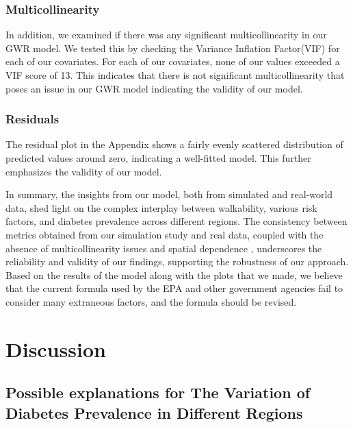 \documentclass[
]{article}
\begin{document}
\subsubsection{Multicollinearity}\label{multicollinearity}

In addition, we examined if there was any significant multicollinearity
in our GWR model. We tested this by checking the Variance Inflation
Factor(VIF) for each of our covariates. For each of our covariates, none
of our values exceeded a VIF score of 13. This indicates that there is
not significant multicollinearity that poses an issue in our GWR model
indicating the validity of our model.

\subsubsection{Residuals}\label{residuals}

The residual plot in the Appendix shows a fairly evenly scattered
distribution of predicted values around zero, indicating a well-fitted
model. This further emphasizes the validity of our model.

In summary, the insights from our model, both from simulated and
real-world data, shed light on the complex interplay between
walkability, various risk factors, and diabetes prevalence across
different regions. The consistency between metrics obtained from our
simulation study and real data, coupled with the absence of
multicollinearity issues and spatial dependence , underscores the
reliability and validity of our findings, supporting the robustness of
our approach. Based on the results of the model along with the plots
that we made, we believe that the current formula used by the EPA and
other government agencies fail to consider many extraneous factors, and
the formula should be revised.

\section{Discussion}\label{discussion}

\subsection{Possible explanations for The Variation of Diabetes
Prevalence in Different
Regions}\label{possible-explanations-for-the-variation-of-diabetes-prevalence-in-different-regions}
\end{document}
